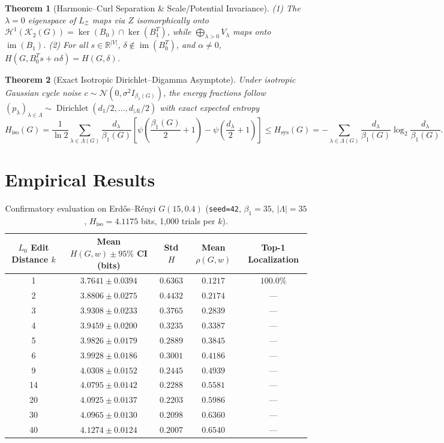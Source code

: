 \documentclass[11pt,a4paper]{article}
\newtheorem{theorem}{Theorem}
\begin{document}
\begin{theorem}[Harmonic--Curl Separation \& Scale/Potential Invariance]
(1) The $\lambda=0$ eigenspace of $L_{\mathcal{Z}}$ maps via $Z$ isomorphically onto $\mathcal{H}^1(\mathcal{K}_2(G)) = \ker(B_0) \cap \ker(B_1^T)$, while $\bigoplus_{\lambda > 0} V_\lambda$ maps onto $\operatorname{im}(B_1)$. (2) For all $s \in \mathbb{R}^{|V|}$, $\delta \notin \operatorname{im}(B_0^T)$, and $\alpha \neq 0$, $H(G, B_0^T s + \alpha \delta) = H(G, \delta)$.
\end{theorem}

\begin{theorem}[Exact Isotropic Dirichlet--Digamma Asymptote]
Under isotropic Gaussian cycle noise $c \sim \mathcal{N}(0, \sigma^2 I_{\beta_1(G)})$, the energy fractions follow $(p_\lambda)_{\lambda \in \Lambda} \sim \operatorname{Dirichlet}(d_1/2, \dots, d_{|\Lambda|}/2)$ with exact expected entropy
\[
H_{\mathrm{iso}}(G) = \frac{1}{\ln 2} \sum_{\lambda \in \Lambda(G)} \frac{d_\lambda}{\beta_1(G)} \left[ \psi\!\left(\frac{\beta_1(G)}{2} + 1\right) - \psi\!\left(\frac{d_\lambda}{2} + 1\right) \right] \le H_{\mathrm{sys}}(G) = -\sum_{\lambda \in \Lambda(G)} \frac{d_\lambda}{\beta_1(G)} \log_2 \frac{d_\lambda}{\beta_1(G)}.
\]
\end{theorem}

\section{Empirical Results}
\begin{table}[h!]
\centering
\caption{Confirmatory evaluation on Erd\H{o}s--R\'enyi $G(15, 0.4)$ (\texttt{seed=42}, $\beta_1=35$, $|\Lambda|=35$, $H_{\mathrm{iso}} = 4.1175$ bits, 1,000 trials per $k$).}
\vspace{4pt}
\begin{tabular}{ccccc}
\toprule
$L_0$ Edit Distance $k$ & Mean $H(G,w) \pm 95\%$ CI (bits) & Std $H$ & Mean $\rho(G,w)$ & Top-1 Localization \\
\midrule
1  & $3.7641 \pm 0.0394$ & $0.6363$ & $0.1217$ & $100.0\%$ \\
2  & $3.8806 \pm 0.0275$ & $0.4432$ & $0.2174$ & --- \\
3  & $3.9308 \pm 0.0233$ & $0.3765$ & $0.2839$ & --- \\
4  & $3.9459 \pm 0.0200$ & $0.3235$ & $0.3387$ & --- \\
5  & $3.9826 \pm 0.0179$ & $0.2889$ & $0.3845$ & --- \\
6  & $3.9928 \pm 0.0186$ & $0.3001$ & $0.4186$ & --- \\
9  & $4.0308 \pm 0.0152$ & $0.2445$ & $0.4939$ & --- \\
14 & $4.0795 \pm 0.0142$ & $0.2288$ & $0.5581$ & --- \\
20 & $4.0925 \pm 0.0137$ & $0.2203$ & $0.5986$ & --- \\
30 & $4.0965 \pm 0.0130$ & $0.2098$ & $0.6360$ & --- \\
40 & $4.1274 \pm 0.0124$ & $0.2007$ & $0.6540$ & --- \\
\bottomrule
\end{tabular}
\end{table}
\end{document}
